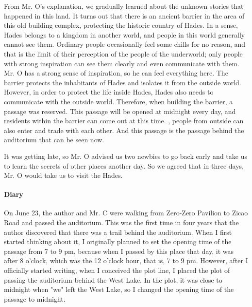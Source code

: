 From Mr. O’s explanation, we gradually learned about the unknown stories that
happened in this land.  It turns out that there is an ancient barrier in the
area of this old building complex, protecting the historic country of Hades.
In a sense, Hades belongs to a kingdom in another world, and people in this
world generally cannot see them. Ordinary people occasionally feel some chills
for no reason, and that is the limit of their perception of the people of the
underworld; only people with strong inspiration can see them clearly and even
communicate with them. Mr. O has a strong sense of inspiration, so he can feel
everything here.  The barrier protects the inhabitants of Hades and isolates it
from the outside world. However, in order to protect the life inside Hades,
Hades also needs to communicate with the outside world. Therefore, when
building the barrier, a passage was reserved. This passage will be opened at
midnight every day, and residents within the barrier can come out at this time.
, people from outside can also enter and trade with each other. And this
passage is the passage behind the auditorium that can be seen now.

It was getting late, so Mr. O advised us two newbies to go back early and take
us to learn the secrets of other places another day. So we agreed that in three
days, Mr. O would take us to visit the Hades.

\vfill

\paragraph{Diary} On June 23, the author and Mr. C were walking from Zero-Zero
Pavilion to Zicao Road and passed the auditorium. This was the first time in
four years that the author discovered that there was a trail behind the
auditorium.  When I first started thinking about it, I originally planned to
set the opening time of the passage from 7 to 9 pm, because when I passed by
this place that day, it was after 8 o'clock, which was the 12 o'clock hour,
that is, 7 to 9 pm.  However, after I officially started writing, when I
conceived the plot line, I placed the plot of passing the auditorium behind the
West Lake. In the plot, it was close to midnight when "we" left the West Lake,
so I changed the opening time of the passage to midnight.
